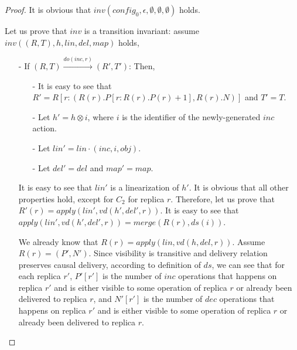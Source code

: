 \begin {proof}

It is obvious that $\mathit{inv}(\mathit{config}_0,\epsilon,\emptyset,\emptyset,\emptyset)$ holds.

Let us prove that $\mathit{inv}$ is a transition invariant: assume $\mathit{inv}((R,T),h,\mathit{lin},\mathit{del},\mathit{map})$ holds,

\begin{itemize}
\setlength{\itemsep}{0.5pt}
\item[-] If $(R,T) {\xrightarrow{\mathit{do}(\mathit{inc},r)}} (R',T')$: Then,

    \begin{itemize}
    \setlength{\itemsep}{0.5pt}
    \item[-] It is easy to see that $R' = R[ r: ( R(r).P[r: R(r).P(r)+1 ], R(r).N ) ]$ and $T' = T$.

    \item[-] Let $h' = h \otimes i$, where $i$ is the identifier of the newly-generated $\mathit{inc}$ action.

    \item[-] Let $\mathit{lin}' = \mathit{lin} \cdot (\mathit{inc},i,\mathit{obj})$.

    \item[-] Let $\mathit{del}' = \mathit{del}$ and $\mathit{map}' = \mathit{map}$.
    \end{itemize}

    It is easy to see that $\mathit{lin}'$ is a linearization of $h'$. It is obvious that all other properties hold, except for $C_2$ for replica $r$. Therefore, let us prove that $R'(r) = \mathit{apply}(\mathit{lin}',\mathit{vd}(h',\mathit{del}',r))$. It is easy to see that $\mathit{apply}(\mathit{lin}',\mathit{vd}(h',\mathit{del}',r)) = \mathit{merge}(R(r),\mathit{ds}(i))$.

    We already know that $R(r) = \mathit{apply}(\mathit{lin},\mathit{vd}(h,\mathit{del},r))$. Assume $R(r)=(P',N')$. Since visibility is transitive and delivery relation preserves causal delivery, according to definition of $\mathit{ds}$, we can see that for each replica $r'$, $P'[r']$ is the number of $\mathit{inc}$ operations that happens on replica $r'$ and is either visible to some operation of replica $r$ or already been delivered to replica $r$, and $N'[r']$ is the number of $\mathit{dec}$ operations that happens on replica $r'$ and is either visible to some operation of replica $r$ or already been delivered to replica $r$.


\end{itemize}
\end{proof}
